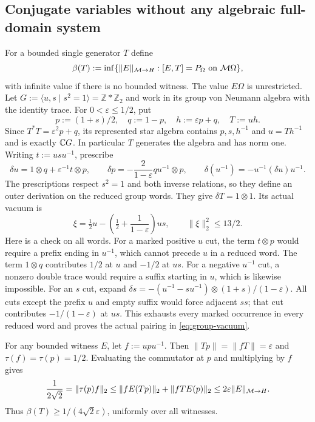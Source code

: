 \subsection{Conjugate variables without any algebraic full-domain system}
For a bounded single generator $T$ define
\[
 \beta(T):=\inf\{\|E\|_{\mathcal M\to H}:[E,T]=P_\Omega\text{ on }\mathcal M\Omega\},
\]
with infinite value if there is no bounded witness.
The value $E\Omega$ is unrestricted.
Let $G:=\langle u,s\mid s^2=1\rangle=\mathbb Z*\mathbb Z_2$ and work in its group von Neumann algebra with the identity trace.
For $0<\varepsilon\le1/2$, put
\[
 p:=(1+s)/2,\quad q:=1-p,\quad h:=\varepsilon p+q,\quad T:=uh.
\]
Since $T^*T=\varepsilon^2p+q$, its represented star algebra contains $p,s,h^{-1}$ and $u=Th^{-1}$ and is exactly $\mathbb C G$.
In particular $T$ generates the algebra and has norm one.
Writing $t:=usu^{-1}$, prescribe
\begin{equation}\label{eq:group-derivative}
 \delta u=1\otimes q+\varepsilon^{-1}t\otimes p,
 \qquad \delta p=-\frac2{1-\varepsilon}qu^{-1}\otimes p,
 \qquad \delta(u^{-1})=-u^{-1}(\delta u)u^{-1}.
\end{equation}
The prescriptions respect $s^2=1$ and both inverse relations, so they define an outer derivation on the reduced group words.
They give $\delta T=1\otimes1$.
Its actual vacuum is
\begin{equation}\label{eq:group-vacuum}
 \xi=\tfrac12u-\left(\tfrac12+\frac1{1-\varepsilon}\right)us,
 \qquad \|\xi\|_2^2\le13/2.
\end{equation}
Here is a check on all words.
For a marked positive $u$ cut, the term $t\otimes p$ would require a prefix ending in $u^{-1}$, which cannot precede $u$ in a reduced word.
The term $1\otimes q$ contributes $1/2$ at $u$ and $-1/2$ at $us$.
For a negative $u^{-1}$ cut, a nonzero double trace would require a suffix starting in $u$, which is likewise impossible.
For an $s$ cut, expand $\delta s=-(u^{-1}-su^{-1})\otimes(1+s)/(1-\varepsilon)$.
All cuts except the prefix $u$ and empty suffix would force adjacent $ss$; that cut contributes $-1/(1-\varepsilon)$ at $us$.
This exhausts every marked occurrence in every reduced word and proves the actual pairing in \eqref{eq:group-vacuum}.

For any bounded witness $E$, let $f:=upu^{-1}$.
Then $\|Tp\|=\|fT\|=\varepsilon$ and $\tau(f)=\tau(p)=1/2$.
Evaluating the commutator at $p$ and multiplying by $f$ gives
\begin{equation}\label{eq:dual-cost}
 \frac1{2\sqrt2}=\|\tau(p)f\|_2
 \le\|fE(Tp)\|_2+\|fTE(p)\|_2
 \le2\varepsilon\|E\|_{\mathcal M\to H}.
\end{equation}
Thus $\beta(T)\ge1/(4\sqrt2\varepsilon)$, uniformly over all witnesses.

